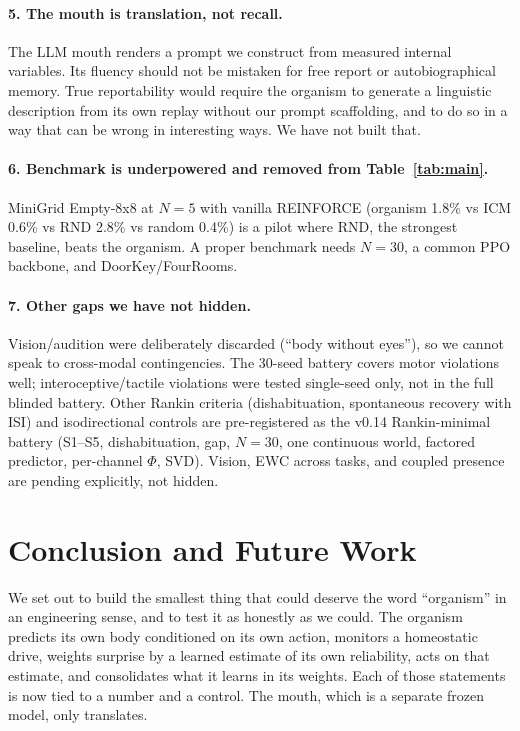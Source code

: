 \documentclass[11pt,a4paper]{article}
\begin{document}
\paragraph{5. The mouth is translation, not recall.} The LLM mouth renders a prompt we construct from measured internal variables. Its fluency should not be mistaken for free report or autobiographical memory. True reportability would require the organism to generate a linguistic description from its own replay without our prompt scaffolding, and to do so in a way that can be wrong in interesting ways. We have not built that.

\paragraph{6. Benchmark is underpowered and removed from Table~\ref{tab:main}.} MiniGrid Empty-8x8 at $N=5$ with vanilla REINFORCE (organism 1.8\% vs ICM 0.6\% vs RND 2.8\% vs random 0.4\%) is a pilot where RND, the strongest baseline, beats the organism. A proper benchmark needs $N=30$, a common PPO backbone, and DoorKey/FourRooms.

\paragraph{7. Other gaps we have not hidden.} Vision/audition were deliberately discarded (``body without eyes''), so we cannot speak to cross-modal contingencies. The 30-seed battery covers motor violations well; interoceptive/tactile violations were tested single-seed only, not in the full blinded battery. Other Rankin criteria (dishabituation, spontaneous recovery with ISI) and isodirectional controls are pre-registered as the v0.14 Rankin-minimal battery (S1--S5, dishabituation, gap, $N=30$, one continuous world, factored predictor, per-channel $\Phi$, SVD). Vision, EWC across tasks, and coupled presence are pending explicitly, not hidden.

\section{Conclusion and Future Work}

We set out to build the smallest thing that could deserve the word ``organism'' in an engineering sense, and to test it as honestly as we could. The organism predicts its own body conditioned on its own action, monitors a homeostatic drive, weights surprise by a learned estimate of its own reliability, acts on that estimate, and consolidates what it learns in its weights. Each of those statements is now tied to a number and a control. The mouth, which is a separate frozen model, only translates.
\end{document}
